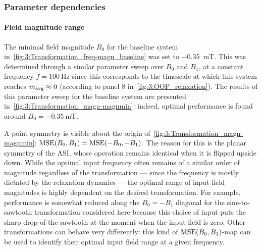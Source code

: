 \subsubsection{Parameter dependencies}
\paragraph{Field magnitude range}
The minimal field magnitude $B_0$ for the baseline system in~\cref{fig:3:Transformation_freq-magn_baseline} was set to \SI{-0.35}{\milli\tesla}.
This was determined through a similar parameter sweep over $B_0$ and $B_1$, at a constant frequency $f=\SI{100}{\hertz}$ since this corresponds to the timescale at which this system reaches $m_\mathrm{avg} \approx 0$ (according to panel 8 in~\cref{fig:3:OOP_relaxation}).
The results of this parameter sweep for the baseline system are presented in~\cref{fig:3:Transformation_magn-magnmin}: 
indeed, optimal performance is found around $B_0=\SI{-0.35}{\milli\tesla}$.

\vspace{-1em}

A point symmetry is visible about the origin of~\cref{fig:3:Transformation_magn-magnmin}: $\mathrm{MSE}(B_0, B_1) = \mathrm{MSE}(-B_0, -B_1)$.
The reason for this is the planar symmetry of the ASI, whose operation remains identical when it is flipped upside down.
While the optimal input frequency often remains of a similar order of magnitude regardless of the transformation --- since the frequency is mostly dictated by the relaxation dynamics --- the optimal range of input field magnitudes is highly dependent on the desired transformation.
For example, performance is somewhat reduced along the $B_0 = -B_1$ diagonal for the sine-to-sawtooth transformation considered here because this choice of input puts the sharp drop of the sawtooth at the moment when the input field is zero.
Other transformations can behave very differently: this kind of $\mathrm{MSE}(B_0, B_1)$-map can be used to identify their optimal input field range at a given frequency.

